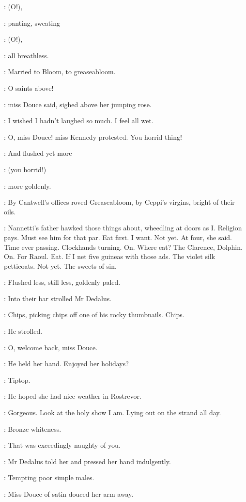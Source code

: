 \MissesDK:
(O!),

:
panting, sweating

\MissesDK:
(O!),

:
all breathless.

:
Married to Bloom,
to greaseabloom.

\MissD:
O saints above!

:
miss Douce said, sighed above her jumping rose.

\MissD:
I wished I hadn't laughed so much.
I feel all wet.

\MissK:
O, miss Douce!
\sout{miss Kennedy protested.}
You horrid thing!

:
And flushed yet more

\MissK:
(you horrid!)

:
more goldenly.

:
By Cantwell's offices roved Greaseabloom,
by Ceppi's virgins,
bright of their oils.

\BloomInt:
Nannetti's father hawked those things about,
wheedling at doors as I.
Religion pays.
Must see him for that par.
Eat first.
I want.
Not yet.
At four, she said.
Time ever passing.
Clockhands turning.
On.
Where eat?
The Clarence, Dolphin.
On.
For Raoul.
Eat.
If I net five guineas with those ads.
The violet silk petticoats.
Not yet.
The sweets of sin.

:
Flushed less,
still less,
goldenly paled.

:
Into their bar strolled Mr Dedalus.

:
Chips,
picking chips off one of his rocky thumbnails.
Chips.

:
He strolled.

\simon:
O, welcome back, miss Douce.

:
He held her hand.
Enjoyed her holidays?

\MissD:
Tiptop.

:
He hoped she had nice weather in Rostrevor.

\MissD:
Gorgeous. Look at the holy show I am. Lying out on the strand
all day.

:
Bronze whiteness.

\simon:
That was exceedingly naughty of you.

:
Mr Dedalus told her and pressed her hand indulgently.

\simon:
Tempting poor simple males.

:
Miss Douce of satin douced her arm away.

